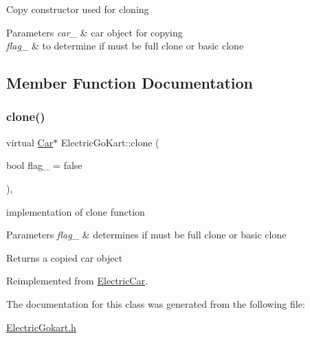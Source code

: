 Copy constructor used for cloning 
\begin{DoxyParams}{Parameters}
{\em car\+\_\+} & car object for copying \\
\hline
{\em flag\+\_\+} & to determine if must be full clone or basic clone \\
\hline
\end{DoxyParams}


\subsection{Member Function Documentation}
\mbox{\label{class_electric_go_kart_a56f6b0c5a68597601f27818f10862bcb}} 
\subsubsection{\texorpdfstring{clone()}{clone()}}
{\footnotesize\ttfamily virtual \mbox{\hyperlink{class_car}{Car}}$\ast$ Electric\+Go\+Kart\+::clone (\begin{DoxyParamCaption}\item[{bool}]{flag\+\_\+ = {\ttfamily false} }\end{DoxyParamCaption})\hspace{0.3cm}{\ttfamily [inline]}, {\ttfamily [virtual]}}

implementation of clone function 
\begin{DoxyParams}{Parameters}
{\em flag\+\_\+} & determines if must be full clone or basic clone \\
\hline
\end{DoxyParams}
\begin{DoxyReturn}{Returns}
a copied car object 
\end{DoxyReturn}


Reimplemented from \mbox{\hyperlink{class_electric_car_a852de7d2208dea4d45a554d9270508d0}{Electric\+Car}}.



The documentation for this class was generated from the following file\+:\begin{DoxyCompactItemize}
\item 
\mbox{\hyperlink{_electric_gokart_8h}{Electric\+Gokart.\+h}}\end{DoxyCompactItemize}
